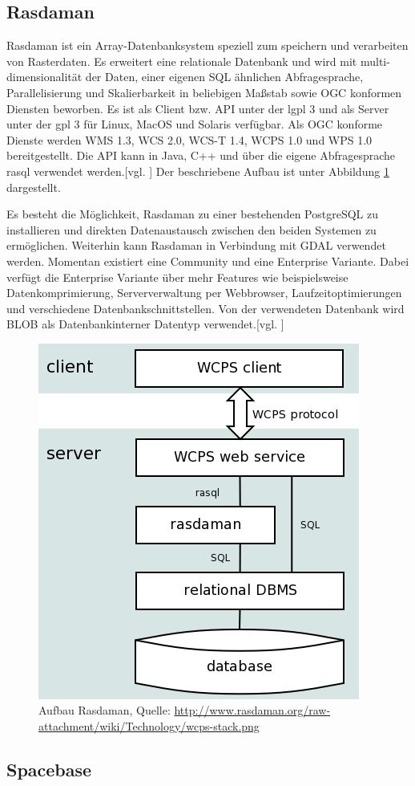 \subsection{Rasdaman}

Rasdaman ist ein Array-Datenbanksystem speziell zum speichern und verarbeiten von Rasterdaten.
Es erweitert eine relationale Datenbank und wird mit  multi-dimensionalität der Daten, einer eigenen SQL ähnlichen Abfragesprache, Parallelisierung und Skalierbarkeit in beliebigen Maßstab sowie OGC konformen Diensten beworben.
Es ist als Client bzw. API unter der \Gls{lgpl} 3 und als Server unter der \Gls{gpl} 3 für Linux, MacOS und Solaris verfügbar.
Als OGC konforme Dienste werden WMS 1.3, WCS 2.0, WCS-T 1.4, WCPS 1.0 und WPS 1.0 bereitgestellt.
Die API kann in Java, C++ und über die eigene Abfragesprache rasql verwendet werden.[vgl. \cite{website:rasdamanogeo}]
Der beschriebene Aufbau ist unter Abbildung \ref{fig:rasdaman} dargestellt.

Es besteht die Möglichkeit, Rasdaman zu einer bestehenden PostgreSQL zu installieren und direkten Datenaustausch zwischen den beiden Systemen zu ermöglichen.
Weiterhin kann Rasdaman in Verbindung mit GDAL verwendet werden.
Momentan existiert eine Community und eine Enterprise Variante. Dabei verfügt die Enterprise Variante über mehr Features wie beispielsweise Datenkomprimierung, Serververwaltung per Webbrowser, Laufzeitoptimierungen und verschiedene Datenbankschnittstellen.
Von der verwendeten Datenbank wird BLOB als Datenbankinterner Datentyp verwendet.[vgl. \cite{website:rasdamanowiki}]
\begin{figure}[h]
\centering
\includegraphics[width=.4\textwidth]{Abbildungen/rasdaman-aufbau.png}
\caption[Aufbau Rasdaman]{Aufbau Rasdaman, Quelle: \url{http://www.rasdaman.org/raw-attachment/wiki/Technology/wcps-stack.png}}
\label{fig:rasdaman}
\end{figure}

\subsection{Spacebase}

